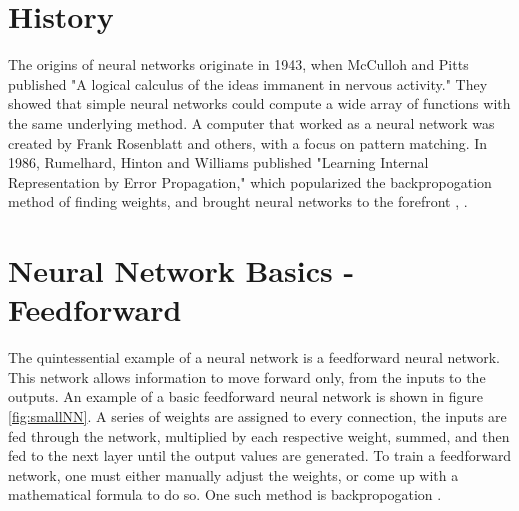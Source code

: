 \documentclass[12pt]{ucthesis}
\begin{document}

\section{History}
\label{History}

The origins of neural networks originate in 1943, when McCulloh and Pitts published "A logical calculus of the ideas immanent in nervous activity." They showed that simple neural networks could compute a wide array of functions with the same underlying method. A computer that worked as a neural network was created by Frank Rosenblatt and others, with a focus on pattern matching. In 1986, Rumelhard, Hinton and Williams published "Learning Internal Representation by Error Propagation," which popularized the backpropogation method of finding weights, and brought neural networks to the forefront \cite{BackpropHist}, \cite{yadav_2015}.


\section{Neural Network Basics - Feedforward}
\label{Neural Network Basics - Feedforward}
The quintessential example of a neural network is a feedforward neural network. This network allows information to move forward only, from the inputs to the outputs. An example of a basic feedforward neural network is shown in figure \ref{fig:smallNN}. A series of weights are assigned to every connection, the inputs are fed through the network, multiplied by each respective weight, summed, and then fed to the next layer until the output values are generated. To train a feedforward network, one must either manually adjust the weights, or come up with a mathematical formula to do so. One such method is backpropogation \cite{feedforwardsource}. 
\end{document}
